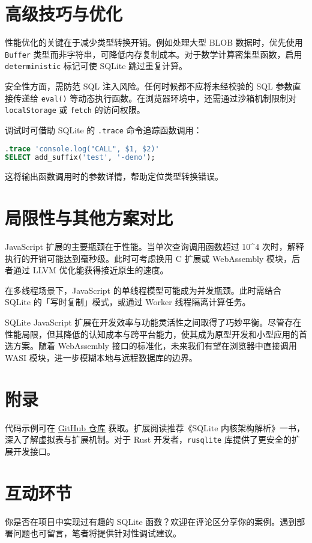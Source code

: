 \chapter{高级技巧与优化}
性能优化的关键在于减少类型转换开销。例如处理大型 BLOB 数据时，优先使用 \verb!Buffer! 类型而非字符串，可降低内存复制成本。对于数学计算密集型函数，启用 \verb!deterministic! 标记可使 SQLite 跳过重复计算。\par
安全性方面，需防范 SQL 注入风险。任何时候都不应将未经校验的 SQL 参数直接传递给 \verb!eval()! 等动态执行函数。在浏览器环境中，还需通过沙箱机制限制对 \verb!localStorage! 或 \verb!fetch! 的访问权限。\par
调试时可借助 SQLite 的 \verb!.trace! 命令追踪函数调用：\par
\begin{lstlisting}[language=sql]
.trace 'console.log("CALL", $1, $2)'
SELECT add_suffix('test', '-demo');
\end{lstlisting}
这将输出函数调用时的参数详情，帮助定位类型转换错误。\par
\chapter{局限性与其他方案对比}
JavaScript 扩展的主要瓶颈在于性能。当单次查询调用函数超过 10\^{}4 次时，解释执行的开销可能达到毫秒级。此时可考虑换用 C 扩展或 WebAssembly 模块，后者通过 LLVM 优化能获得接近原生的速度。\par
在多线程场景下，JavaScript 的单线程模型可能成为并发瓶颈。此时需结合 SQLite 的「写时复制」模式，或通过 Worker 线程隔离计算任务。\par
SQLite JavaScript 扩展在开发效率与功能灵活性之间取得了巧妙平衡。尽管存在性能局限，但其降低的认知成本与跨平台能力，使其成为原型开发和小型应用的首选方案。随着 WebAssembly 接口的标准化，未来我们有望在浏览器中直接调用 WASI 模块，进一步模糊本地与远程数据库的边界。\par
\chapter{附录}
代码示例可在 \href{https://github.com/sqlite-js/examples}{GitHub 仓库} 获取。扩展阅读推荐《SQLite 内核架构解析》一书，深入了解虚拟表与扩展机制。对于 Rust 开发者，\verb!rusqlite! 库提供了更安全的扩展开发接口。\par
\chapter{互动环节}
你是否在项目中实现过有趣的 SQLite 函数？欢迎在评论区分享你的案例。遇到部署问题也可留言，笔者将提供针对性调试建议。\par
